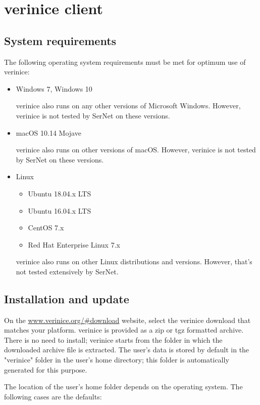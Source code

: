 \documentclass[a4paper,10pt]{book}
\begin{document}
\section{verinice client}
\subsection{System requirements}
The following operating system requirements must be met for optimum use of
verinice:

\begin{itemize}
  \item Windows 7, Windows 10

    verinice also runs on any other versions of Microsoft Windows. However, verinice
    is not tested by SerNet on these versions.

  \item macOS 10.14 Mojave

    verinice also runs on other versions of macOS. However, verinice is not tested
    by SerNet on these versions.

  \item Linux
    \begin{itemize}
      \item Ubuntu 18.04.x LTS
      \item Ubuntu 16.04.x LTS
      \item CentOS 7.x
      \item Red Hat Enterprise Linux 7.x
    \end{itemize}

    verinice also runs on other Linux distributions and versions.
    However, that's not tested extensively by SerNet.
\end{itemize}

\subsection{Installation and update}
\label{sec:installation} %
On the \href{http://verinice.org/\#download}{www.verinice.org/\#download}
website, select the verinice download that matches your platform. verinice is
provided as a zip or tgz formatted archive. There is no need to install;
verinice starts from the folder in which the downloaded archive file is
extracted. The user's data is stored by default in the "verinice" folder in
the user's home directory; this folder is automatically generated for this
purpose.

The location of the user's home folder depends on the operating system. The
following cases are the defaults:
\end{document}
